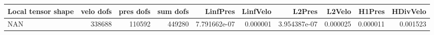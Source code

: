 \begin{tabular}{lrrrrrrrrr}
\toprule
Local tensor shape &  velo dofs &  pres dofs &  sum dofs &     LinfPres &  LinfVelo &       L2Pres &   L2Velo &   H1Pres &  HDivVelo \\
\midrule
               NAN &     338688 &     110592 &    449280 & 7.791662e-07 &  0.000001 & 3.954387e-07 & 0.000025 & 0.000011 &  0.001523 \\
\bottomrule
\end{tabular}
